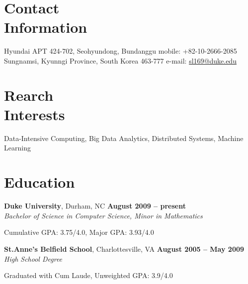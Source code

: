 \documentclass[11pt,margin,line]{cv}
\begin{document}
\begin{resume}

    \section{\mysidestyle Contact\\Information}
    Hyundai APT 424-702, Seohyundong, Bundanggu                   \hfill mobile: +82-10-2666-2085               \vspace{1mm}\\\vspace{0mm}%
    Sungnamsi, Kyunngi Province, South Korea 463-777          \hfill e-mail: \href{mailto:sl169@duke.edu}{sl169@duke.edu} \vspace{1mm}\\\vspace{-4.5mm}%
    \section{\mysidestyle Rearch\\Interests}
    Data-Intensive Computing, Big Data Analytics, Distributed Systems, Machine Learning\vspace{1mm}

    \section{\mysidestyle Education}
    \textbf{Duke University}, Durham, NC \hfill \textbf{August 2009 -- present}\vspace{1mm}\\\vspace{0mm}%
    \textsl{Bachelor of Science in Computer Science, Minor in Mathematics}
    \vspace{-2mm}\\\vspace{-1mm}%
    \begin{list3}
        \item Cumulative GPA: 3.75/4.0, Major GPA: 3.93/4.0
    \end{list3}
    \textbf{St.Anne's Belfield School}, Charlottesville, VA \hfill \textbf{August 2005 -- May 2009}\vspace{1mm}\\\vspace{0mm}%
    \textsl{High School Degree}
    \vspace{-2mm}\\\vspace{-1mm}%
    \begin{list3}
        \item Graduated with Cum Laude, Unweighted GPA: 3.9/4.0
    \end{list3}


\end{resume}
\end{document}
